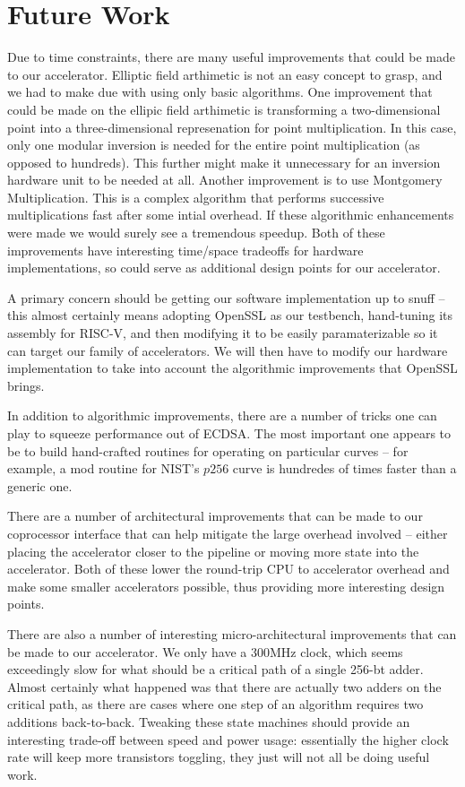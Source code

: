 \documentclass[twocolumn]{article}
\begin{document}
\section{Future Work}

Due to time constraints, there are many useful improvements that could
be made to our accelerator. Elliptic field arthimetic is not an easy
concept to grasp, and we had to make due with using only basic
algorithms. One improvement that could be made on the ellipic field
arthimetic is transforming a two-dimensional point into a
three-dimensional represenation for point multiplication. In this
case, only one modular inversion is needed for the entire point
multiplication (as opposed to hundreds). This further might make it
unnecessary for an inversion hardware unit to be needed at
all. Another improvement is to use Montgomery
Multiplication\cite{mmm-hw_ecc}. This is a complex algorithm that
performs successive multiplications fast after some intial
overhead. If these algorithmic enhancements were made we would surely
see a tremendous speedup. Both of these improvements have interesting
time/space tradeoffs for hardware implementations, so could serve as
additional design points for our accelerator.

A primary concern should be getting our software
implementation up to snuff -- this almost certainly means adopting
OpenSSL as our testbench, hand-tuning its assembly for RISC-V, and
then modifying it to be easily paramaterizable so it can target our
family of accelerators. We will then have to modify our hardware 
implementation to take into account the algorithmic improvements that 
OpenSSL brings.

In addition to algorithmic improvements, there are a number of tricks
one can play to squeeze performance out of ECDSA.  The most important
one appears to be to build hand-crafted routines for operating on
particular curves -- for example, a mod routine for NIST's $p256$
curve is hundredes of times faster than a generic
one\cite{nist-routines}.

There are a number of architectural improvements that can be made to
our coprocessor interface that can help mitigate the large overhead
involved -- either placing the accelerator closer to the pipeline or
moving more state into the accelerator.  Both of these lower the
round-trip CPU to accelerator overhead and make some smaller
accelerators possible, thus providing more interesting design points.

There are also a number of interesting micro-architectural
improvements that can be made to our accelerator.  We only have a
300MHz clock, which seems exceedingly slow for what should be a
critical path of a single 256-bt adder.  Almost certainly what
happened was that there are actually two adders on the critical path,
as there are cases where one step of an algorithm requires two
additions back-to-back.  Tweaking these state machines should provide
an interesting trade-off between speed and power usage: essentially
the higher clock rate will keep more transistors toggling, they just
will not all be doing useful work.
\end{document}

